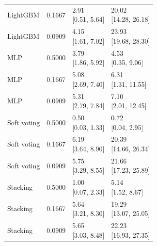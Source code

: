 \begin{longtable}{llll}
LightGBM & 0.1667 & \shortstack{{2.91} \\ {[0.51, 5.64]}} & \shortstack{{20.02} \\ {[14.28, 26.18]}} \\
LightGBM & 0.0909 & \shortstack{{4.15} \\ {[1.61, 7.02]}} & \shortstack{{23.93} \\ {[19.68, 28.30]}} \\
MLP & 0.5000 & \shortstack{{3.79} \\ {[1.86, 5.92]}} & \shortstack{{4.53} \\ {[0.35, 9.06]}} \\
MLP & 0.1667 & \shortstack{{5.08} \\ {[2.69, 7.40]}} & \shortstack{{6.31} \\ {[1.31, 11.55]}} \\
MLP & 0.0909 & \shortstack{{5.31} \\ {[2.79, 7.84]}} & \shortstack{{7.10} \\ {[2.01, 12.45]}} \\
Soft voting & 0.5000 & \shortstack{{0.50} \\ {[0.03, 1.33]}} & \shortstack{{0.72} \\ {[0.04, 2.95]}} \\
Soft voting & 0.1667 & \shortstack{{6.19} \\ {[3.64, 8.90]}} & \shortstack{{20.39} \\ {[14.66, 26.34]}} \\
Soft voting & 0.0909 & \shortstack{{5.75} \\ {[3.29, 8.55]}} & \shortstack{{21.66} \\ {[17.23, 25.89]}} \\
Stacking & 0.5000 & \shortstack{{1.00} \\ {[0.07, 2.33]}} & \shortstack{{5.14} \\ {[1.52, 8.67]}} \\
Stacking & 0.1667 & \shortstack{{5.64} \\ {[3.21, 8.30]}} & \shortstack{{19.29} \\ {[13.07, 25.05]}} \\
Stacking & 0.0909 & \shortstack{{5.65} \\ {[3.03, 8.48]}} & \shortstack{{22.23} \\ {[16.93, 27.35]}} \\
\bottomrule
\end{longtable}
\endgroup
